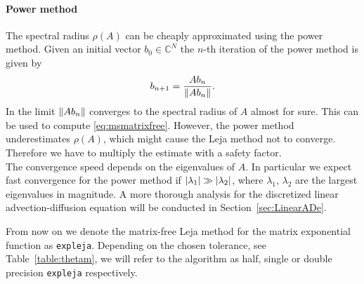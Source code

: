 \documentclass{scrartcl}
\begin{document}
	\paragraph{Power method}
	The spectral radius $\rho(A)$ can be cheaply approximated using the power method. 
	Given an initial vector $b_0\in\mathbb{C}^N$ the $n$-th iteration of the power method is given by
	\[
		b_{n+1} = \frac{Ab_n}{\lVert Ab_n\rVert}.
	\]
	In the limit $\lVert Ab_{n}\rVert$ converges to the spectral radius of $A$ almost for sure. This can be used to compute \eqref{eq:msmatrixfree}. However, the power method underestimates $\rho(A)$, which might cause the Leja method not to converge. Therefore we have to multiply the estimate with a safety factor. \\The convergence speed depends on the eigenvalues of $A$. In particular we expect fast convergence for the power method if $\lvert\lambda_{1}\rvert\gg\lvert\lambda_{2}\rvert$, where $\lambda_{1}$, $\lambda_{2}$ are the largest eigenvalues in magnitude. A more thorough analysis for the discretized linear advection-diffusion equation will be conducted in Section~\ref{sec:LinearADe}.

	From now on we denote the matrix-free Leja method for the matrix exponential function as \texttt{expleja}. Depending on the chosen tolerance, see Table~\ref{table:thetam}, we will refer to the algorithm as half, single or double precision \texttt{expleja} respectively.
	
\end{document}
